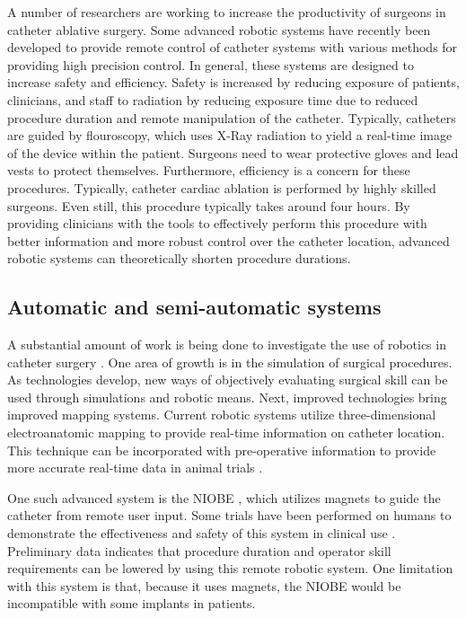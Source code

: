 \documentclass[letterpaper,10pt,conference]{ieeeconf}   %
\begin{document}
A number of researchers are working to increase the productivity of surgeons in catheter ablative surgery. Some advanced robotic systems have recently been developed to provide remote control of catheter systems with various methods for providing high precision control. In general, these systems are designed to increase safety and efficiency. Safety is increased by reducing exposure of patients, clinicians, and staff to radiation by reducing exposure time due to reduced procedure duration and remote manipulation of the catheter. Typically, catheters are guided by flouroscopy, which uses X-Ray radiation to yield a real-time image of the device within the patient. Surgeons need to wear protective gloves and lead vests to protect themselves. Furthermore, efficiency is a concern for these procedures. Typically, catheter cardiac ablation is performed by highly skilled surgeons. Even still, this procedure typically takes around four hours. By providing clinicians with the tools to effectively perform this procedure with better information and more robust control over the catheter location, advanced robotic systems can theoretically shorten procedure durations.

\subsection{Automatic and semi-automatic systems}
\label{sec:autosemiauto}

A substantial amount of work is being done to investigate the use of robotics in catheter surgery \cite{rafii2014current}. One area of growth is in the simulation of surgical procedures. As technologies develop, new ways of objectively evaluating surgical skill can be used through simulations and robotic means. Next, improved technologies bring improved mapping systems. Current robotic systems utilize three-dimensional electroanatomic mapping to provide real-time information on catheter location. This technique can be incorporated with pre-operative information to provide more accurate real-time data in animal trials \cite{reddy:07a}.

One such advanced system is the NIOBE \cite{NIOBE}, which utilizes magnets to guide the catheter from remote user input. Some trials have been performed on humans to demonstrate the effectiveness and safety of this system in clinical use \cite{pappone:06a}. Preliminary data indicates that procedure duration and operator skill requirements can be lowered by using this remote robotic system. One limitation with this system is that, because it uses magnets, the NIOBE would be incompatible with some implants in patients. 
\end{document}
